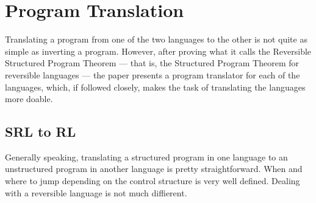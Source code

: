 \section{Program Translation}
Translating a program from one of the two languages to the other is not quite as simple as inverting a program. However, after proving what it calls the Reversible Structured Program Theorem --- that is, the Structured Program Theorem for reversible languages --- the paper \cite{REV} presents a program translator for each of the languages, which, if followed closely, makes the task of translating the languages more doable.

\subsection{SRL to RL}

Generally speaking, translating a structured program in one language to an unstructured program in another language is pretty straightforward. When and where to jump depending on the control structure is very well defined. Dealing with a reversible language is not much diffierent.

